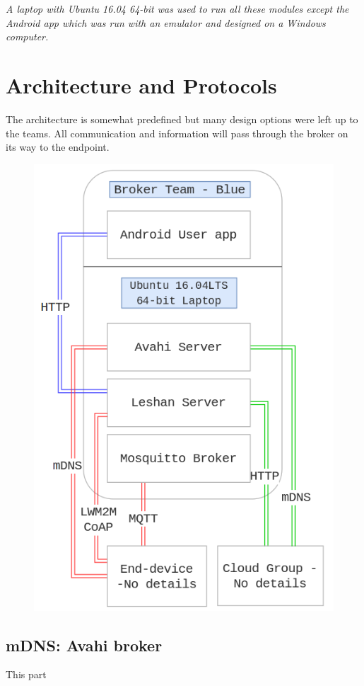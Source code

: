 \documentclass[conference]{IEEEtran}
\begin{document}
\textit{A laptop with Ubuntu 16.04 64-bit was used to run all these modules except the Android app which was run with an emulator and designed on a Windows computer.}

\section{Architecture and Protocols}

The architecture is somewhat predefined but many design options were left up to the teams. All communication and information will pass through the broker on its way to the endpoint. 

\begin{figure}[h]
	\begin{center}
		\includegraphics[width=0.8\linewidth]{img/overview}
		\caption{}
		\label{fig:fig2}
	\end{center}
\end{figure}



\subsection{mDNS: Avahi broker}
This part 
\end{document}
